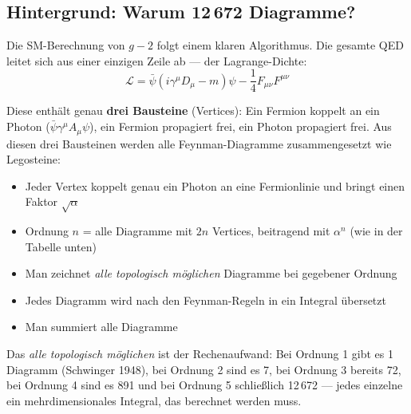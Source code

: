 \subsection{Hintergrund: Warum 12\,672 Diagramme?}

Die SM-Berechnung von $g-2$ folgt einem klaren Algorithmus. Die gesamte QED leitet sich aus einer einzigen Zeile ab — der Lagrange-Dichte:
\begin{equation}
	\mathcal{L} = \bar{\psi}(i\gamma^\mu D_\mu - m)\psi - \frac{1}{4}F_{\mu\nu}F^{\mu\nu}
\end{equation}

Diese enthält genau \textbf{drei Bausteine} (Vertices): Ein Fermion koppelt an ein Photon ($\bar{\psi}\gamma^\mu A_\mu \psi$), ein Fermion propagiert frei, ein Photon propagiert frei. Aus diesen drei Bausteinen werden alle Feynman-Diagramme zusammengesetzt wie Legosteine:

\begin{itemize}
	\item Jeder Vertex koppelt genau ein Photon an eine Fermionlinie und bringt einen Faktor $\sqrt{\alpha}$
	\item Ordnung $n$ = alle Diagramme mit $2n$ Vertices, beitragend mit $\alpha^{n}$ (wie in der Tabelle unten)
	\item Man zeichnet \textit{alle topologisch möglichen} Diagramme bei gegebener Ordnung
	\item Jedes Diagramm wird nach den Feynman-Regeln in ein Integral übersetzt
	\item Man summiert alle Diagramme
\end{itemize}

Das \textit{alle topologisch möglichen} ist der Rechenaufwand: Bei Ordnung 1 gibt es 1 Diagramm (Schwinger 1948), bei Ordnung 2 sind es 7, bei Ordnung 3 bereits 72, bei Ordnung 4 sind es 891 und bei Ordnung 5 schließlich 12\,672 — jedes einzelne ein mehrdimensionales Integral, das berechnet werden muss.

\begin{table}[h]
	\centering
	\caption{Wachstum der Feynman-Diagramme nach Ordnung in QED}
	\label{tab:diagrams}
\end{table}

